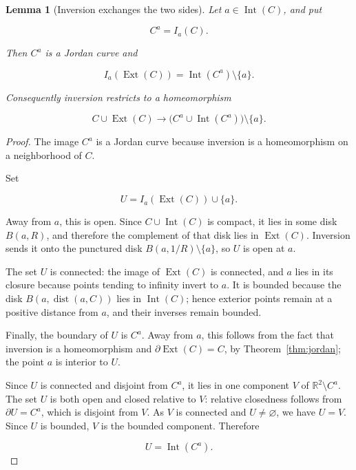 \documentclass[11pt]{article}
\theoremstyle{mainplain}
\newtheorem{lemma}[theorem]{Lemma}
\theoremstyle{mainroman}
\theoremstyle{definition}
\numberwithin{equation}{section}
\begin{document}
\begin{lemma}[Inversion exchanges the two sides]\label{lem:inversion-sides}
Let \(a\in\operatorname{Int}(C)\), and put

\[
C^a=I_a(C).
\]

Then \(C^a\) is a Jordan curve and

\[
I_a(\operatorname{Ext}(C))
 =
\operatorname{Int}(C^a)\setminus\{a\}.
\]

Consequently inversion restricts to a homeomorphism

\[
C\cup\operatorname{Ext}(C)
 \longrightarrow
\bigl(C^a\cup\operatorname{Int}(C^a)\bigr)\setminus\{a\}.
\]
\end{lemma}
\begin{proof}
The image \(C^a\) is a Jordan curve because inversion is a homeomorphism on a neighborhood of \(C\).

Set

\[
U=I_a(\operatorname{Ext}(C))\cup\{a\}.
\]

Away from \(a\), this is open. Since \(C\cup\operatorname{Int}(C)\) is compact, it lies in some disk \(B(a,R)\), and therefore the complement of that disk lies in \(\operatorname{Ext}(C)\). Inversion sends it onto the punctured disk \(B(a,1/R)\setminus\{a\}\), so \(U\) is open at \(a\).

The set \(U\) is connected: the image of \(\operatorname{Ext}(C)\) is connected, and \(a\) lies in its closure because points tending to infinity invert to \(a\). It is bounded because the disk \(B(a,\operatorname{dist}(a,C))\) lies in \(\operatorname{Int}(C)\); hence exterior points remain at a positive distance from \(a\), and their inverses remain bounded.

Finally, the boundary of \(U\) is \(C^a\). Away from \(a\), this follows from the fact that inversion is a homeomorphism and \(\partial\operatorname{Ext}(C)=C\), by Theorem~\ref{thm:jordan}; the point \(a\) is interior to \(U\).

Since \(U\) is connected and disjoint from \(C^a\), it lies in one component \(V\) of \(\mathbb R^2\setminus C^a\). The set \(U\) is both open and closed relative to \(V\): relative closedness follows from \(\partial U=C^a\), which is disjoint from \(V\). As \(V\) is connected and \(U\ne\varnothing\), we have \(U=V\). Since \(U\) is bounded, \(V\) is the bounded component. Therefore

\[
U=\operatorname{Int}(C^a).
\] \end{proof}
\end{document}
